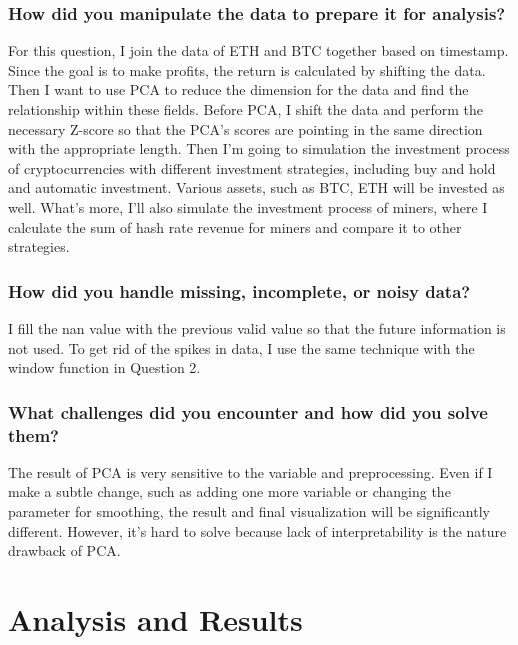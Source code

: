 \documentclass[a4paper]{article}
\begin{document}
\subsubsection{How did you manipulate the data to prepare it for analysis?}
    For this question, I join the data of ETH and BTC together based on timestamp. Since the goal is to make profits, the return is calculated by shifting the data. Then I want to use PCA to reduce the dimension for the data and find the relationship within these fields. Before PCA, I shift the data and perform the necessary Z-score so that the PCA's scores are pointing in the same direction with the appropriate length. Then I'm going to simulation the investment process of cryptocurrencies with different investment strategies, including buy and hold and automatic investment. Various assets, such as BTC, ETH will be invested as well. What's more, I'll also simulate the investment process of miners, where I calculate the sum of hash rate revenue for miners and compare it to other strategies.
\subsubsection{How did you handle missing, incomplete, or noisy data?}
    I fill the nan value with the previous valid value so that the future information is not used. To get rid of the spikes in data, I use the same technique with the window function in Question 2.
\subsubsection{What challenges did you encounter and how did you solve them?}
    The result of PCA is very sensitive to the variable and preprocessing. Even if I make a subtle change, such as adding one more variable or changing the parameter for smoothing, the result and final visualization will be significantly different. However, it's hard to solve because lack of interpretability is the nature drawback of PCA. 
\section{Analysis and Results}
\end{document}

